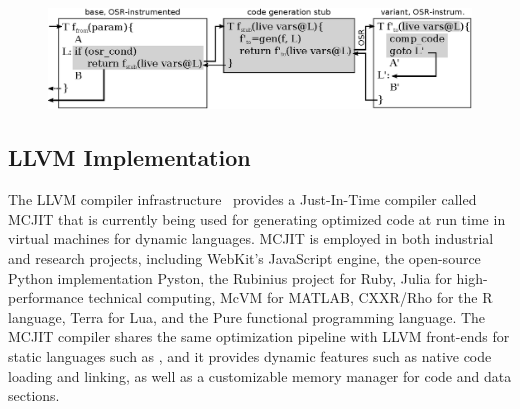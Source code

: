 
\ifdefined\noauthorea
\begin{figure}[t]
\begin{center}
\includegraphics[width=1.0\textwidth]{figures/osr-open/osr-open.eps}
\caption{\protect}
\end{center}
\end{figure}
\fi

\subsection{LLVM Implementation}
\label{ss:osrkit-implementation}

The LLVM compiler infrastructure~\cite{Lattner04} provides a Just-In-Time compiler called MCJIT that is currently being used for generating optimized code at run time in virtual machines for dynamic languages. MCJIT is employed in both industrial and research projects, including WebKit's JavaScript engine, the open-source Python implementation Pyston, the Rubinius project for Ruby, Julia for high-performance technical computing, McVM for MATLAB, CXXR/Rho for the R language, Terra for Lua, and the Pure functional programming language. The MCJIT compiler shares the same optimization pipeline with LLVM front-ends for static languages such as \clang, and it provides dynamic features such as native code loading and linking, as well as a customizable memory manager for code and data sections.

